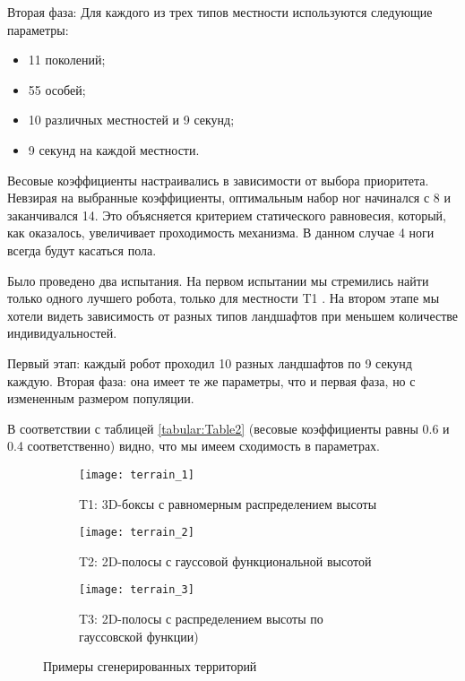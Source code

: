 Вторая фаза: Для каждого из трех типов местности используются следующие параметры:
\begin{itemize}
\item 11 поколений;
\item 55 особей;
\item 10 различных местностей и 9 секунд;
\item 9 секунд на каждой местности.
\end{itemize}

Весовые коэффициенты настраивались в зависимости от выбора приоритета. Невзирая на выбранные коэффициенты, оптимальным набор ног начинался с 8 и заканчивался 14. Это объясняется критерием статического равновесия, который, как оказалось, увеличивает проходимость механизма. В данном случае 4 ноги всегда будут касаться пола. 

Было проведено два испытания. На первом испытании мы стремились найти только одного лучшего робота, только для местности T1 . На втором этапе мы хотели видеть зависимость от разных типов ландшафтов при меньшем количестве индивидуальностей.

Первый этап: каждый робот проходил 10 разных ландшафтов по 9 секунд каждую. Вторая фаза: она имеет те же параметры, что и первая фаза, но с измененным размером популяции. 

В соответствии с таблицей \ref{tabular:Table2} (весовые коэффициенты равны 0.6 и 0.4 соответственно) видно, что мы имеем сходимость в параметрах.

\begin{figure}[h]
    \begin{subfigure}{0.33\textwidth}
    \centering\texttt{[image: terrain\_1]} 
    \caption{T1: 3D-боксы с равномерным распределением высоты}
    \label{fig:terrain_1}
    \end{subfigure}
    \begin{subfigure}{0.33\textwidth}
    \centering\texttt{[image: terrain\_2]} 
    \caption{T2: 2D-полосы с гауссовой функциональной высотой}
    \label{fig:terrain_2}
    \end{subfigure}
    \begin{subfigure}{0.33\textwidth}
    \centering\texttt{[image: terrain\_3]}
    \caption{T3: 2D-полосы с распределением высоты по гауссовской функции)}
    \label{fig:terrain_3}
    \end{subfigure}
     
    \caption{Примеры сгенерированных территорий}
    \label{fig:terrains}
\end{figure}
\vspace{-0.5cm}

